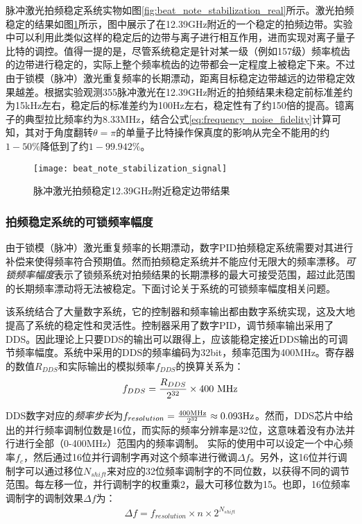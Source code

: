 脉冲激光拍频稳定系统实物如图\ref{fig:beat_note_stabilization_real}所示。激光拍频稳定的结果如图\ref{fig:beat_note_stabilization_signal}所示，图中展示了在12.39GHz附近的一个稳定的拍频边带。实验中可以利用此类似这样的稳定后的边带与离子进行相互作用，进而实现对离子量子比特的调控。值得一提的是，尽管系统稳定是针对某一级（例如157级）频率梳齿的边带进行稳定的，实际上整个频率梳齿的边带都会一定程度上被稳定下来。不过由于锁模（脉冲）激光重复频率的长期漂动，距离目标稳定边带越远的边带稳定效果越差。根据实验观测355脉冲激光在12.39GHz附近的拍频结果未稳定前标准差约为15kHz左右，稳定后的标准差约为100Hz左右，稳定性有了约150倍的提高。镱离子的典型拉比频率约为8.33MHz，结合公式\eqref{eq:frequency_noise_fidelity}计算可知，其对于角度翻转$\theta=\pi$的单量子比特操作保真度的影响从完全不能用的约$1-50\%$降低到了约$1-99.942\%$。

\begin{figure}
    \centering
    \caption[脉冲激光拍频稳定12.39GHz附近稳定边带结果]{脉冲激光拍频稳定12.39GHz附近稳定边带结果\label{fig:beat_note_stabilization_signal}}
    \texttt{[image: beat\_note\_stabilization\_signal]}
\end{figure}

\subsubsection[拍频稳定系统的可锁频率幅度]{拍频稳定系统的可锁频率幅度}
由于锁模（脉冲）激光重复频率的长期漂动，数字PID拍频稳定系统需要对其进行补偿来使得频率符合预期值。然而拍频稳定系统并不能应付无限大的频率漂移。\emph{可锁频率幅度}表示了锁频系统对拍频结果的长期漂移的最大可接受范围，超过此范围的长期频率漂动将无法被稳定。下面讨论关于系统的可锁频率幅度相关问题。

该系统结合了大量数字系统，它的控制器和频率输出都由数字系统实现，这及大地提高了系统的稳定性和灵活性。控制器采用了数字PID，调节频率输出采用了DDS。因此理论上只要DDS的输出可以跟得上，应该能稳定接近DDS输出的可调节频率幅度。系统中采用的DDS的频率编码为32bit，频率范围为400MHz。寄存器的数值$R_{DDS}$和实际输出的模拟频率$f_{DDS}$的换算关系为：
\begin{align}
    f_{DDS}=\frac{R_{DDS}}{2^{32}}\times 400\ \textnormal{MHz}
\end{align}

DDS数字对应的\emph{频率步长}为$f_{resolution}=\frac{400\textnormal{MHz}}{2^{32}}\approx0.093\textnormal{Hz}$。然而，DDS芯片中给出的并行频率调制位数是16位，而实际的频率分辨率是32位，这意味着没有办法并行进行全部（0-400MHz）范围内的频率调制。
实际的使用中可以设定一个中心频率$f_{c}$，然后通过16位并行调制字再对这个频率进行微调$\Delta f$。另外，这16位并行调制字可以通过移位$N_{shift}$来对应的32位频率调制字的不同位数，以获得不同的调节范围。每左移一位，并行调制字的权重乘2，最大可移位数为15。也即，16位频率调制字的调制效果$\Delta f$为：
\begin{align}
    \Delta f=f_{resolution}\times n \times 2^{N_{shift}}
\end{align}


